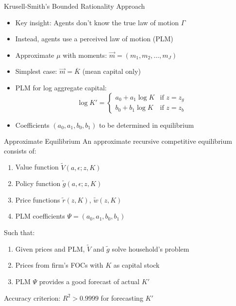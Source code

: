 \documentclass[aspectratio=169]{beamer}
\newcommand{\1}{\mathbf{1}}
\begin{document}
\begin{frame}{Krusell-Smith's Bounded Rationality Approach}
  \begin{itemize}
      \item Key insight: Agents don't know the true law of motion $\Gamma$
      \item Instead, agents use a perceived law of motion (PLM)
      \item Approximate $\mu$ with moments: $\vec{m} = (m_1, m_2, \ldots, m_J)$
      \item Simplest case: $\vec{m} = \bar{K}$ (mean capital only)
      \item PLM for log aggregate capital:
      \[
      \log K' = 
      \begin{cases}
      a_0 + a_1 \log K & \text{if } z = z_g \\
      b_0 + b_1 \log K & \text{if } z = z_b
      \end{cases}
      \]
      \item Coefficients $(a_0, a_1, b_0, b_1)$ to be determined in equilibrium
  \end{itemize}
\end{frame}

\begin{frame}{Approximate Equilibrium}
  \small
  An approximate recursive competitive equilibrium consists of:
  \begin{enumerate}
      \item Value function $\tilde{V}(a, \epsilon; z, K)$
      \item Policy function $\tilde{g}(a, \epsilon; z, K)$
      \item Price functions $\tilde{r}(z, K)$, $\tilde{w}(z, K)$
      \item PLM coefficients $\Psi = (a_0, a_1, b_0, b_1)$
  \end{enumerate}
  Such that:
  \begin{enumerate}
      \item[(i)] Given prices and PLM, $\tilde{V}$ and $\tilde{g}$ solve household's problem
      \item[(ii)] Prices from firm's FOCs with $K$ as capital stock
      \item[(iii)] PLM $\Psi$ provides a good forecast of actual $K'$
  \end{enumerate}
  \vspace{0.5em}
  Accuracy criterion: $R^2 > 0.9999$ for forecasting $K'$
\end{frame}
\end{document}

